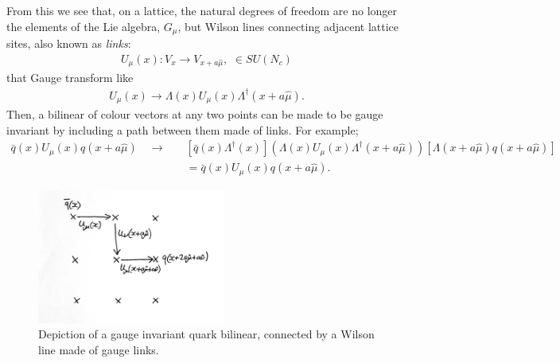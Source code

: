 From this we see that, on a lattice, the natural degrees of freedom are no longer the elements of the Lie algebra, $G_{\mu}$, but Wilson lines connecting adjacent lattice sites, also known as {\it{links}}:
\begin{align}
  U_{\mu}(x) : V_x \to V_{x+a\hat{\mu}},\,\,\in SU(N_c)
\end{align}
that Gauge transform like
\begin{align}
  U_{\mu}(x) \to \Lambda(x) U_{\mu}(x) \Lambda^{\dagger}(x+a\hat{\mu}).
\end{align}
Then, a bilinear of colour vectors at any two points can be made to be gauge invariant by including a path between them made of links. For example;
\begin{align}
  \nonumber
  \bar{q}(x)U_{\mu}(x)q(x+a\hat{\mu}) \quad \to\quad &[\bar{q}(x)\Lambda^{\dagger}(x)](\Lambda(x) U_{\mu}(x) \Lambda^{\dagger}(x+a\hat{\mu})) [\Lambda(x+a\hat{\mu})q(x+a\hat{\mu})]
  \\
  &= \bar{q}(x)U_{\mu}(x)q(x+a\hat{\mu}).
\end{align}

\begin{figure}
  \begin{center}
    \hspace{+20pt}
    \vspace{-10pt}
    \includegraphics[width=0.55\textwidth]{images/wilson_line.jpg}
    \caption{Depiction of a gauge invariant quark bilinear, connected by a Wilson line made of gauge links.}
  \end{center}
  \vspace{-10pt}
\end{figure}

